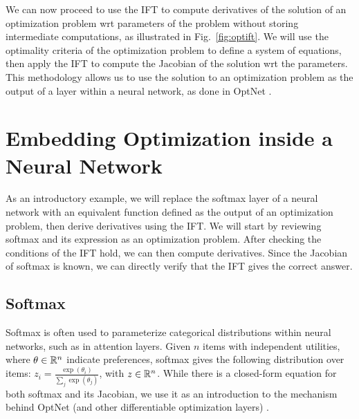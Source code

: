 \documentclass[11pt]{article}
\begin{document}
We can now proceed to use the IFT
to compute derivatives of the solution of an optimization problem
wrt parameters of the problem without storing intermediate computations,
as illustrated in Fig.~\ref{fig:optift}.
We will use the optimality criteria of the optimization problem to define a system of equations,
then apply the IFT to compute the Jacobian of the solution wrt the parameters.
This methodology allows us to use the solution to an optimization problem
as the output of a layer within a neural network,
as done in OptNet \citep{optnet}.


\section{Embedding Optimization inside a Neural Network}
As an introductory example,
we will replace the softmax layer of a neural network with an equivalent function
defined as the output of an optimization problem, then derive derivatives using the IFT.
We will start by reviewing softmax and its expression as an optimization problem.
After checking the conditions of the IFT hold, we can then compute derivatives.
Since the Jacobian of softmax is known, we can directly verify that the IFT gives
the correct answer.

\subsection{Softmax}
Softmax is often used to parameterize categorical distributions within neural networks,
such as in attention layers.
Given $n$ items with independent utilities, where $\theta \in \mathbb{R}^n$
indicate preferences,
softmax gives the following distribution over items:
$z_i = \frac{\exp(\theta_i)}{\sum_j \exp(\theta_j)}$, with $z\in\mathbb{R}^n$.
While there is a closed-form equation
for both softmax and its Jacobian,
we use it as an introduction to the mechanism
behind OptNet (and other differentiable optimization layers)
\citep{optnet,agrawal2019diffcvx}.
\end{document}
